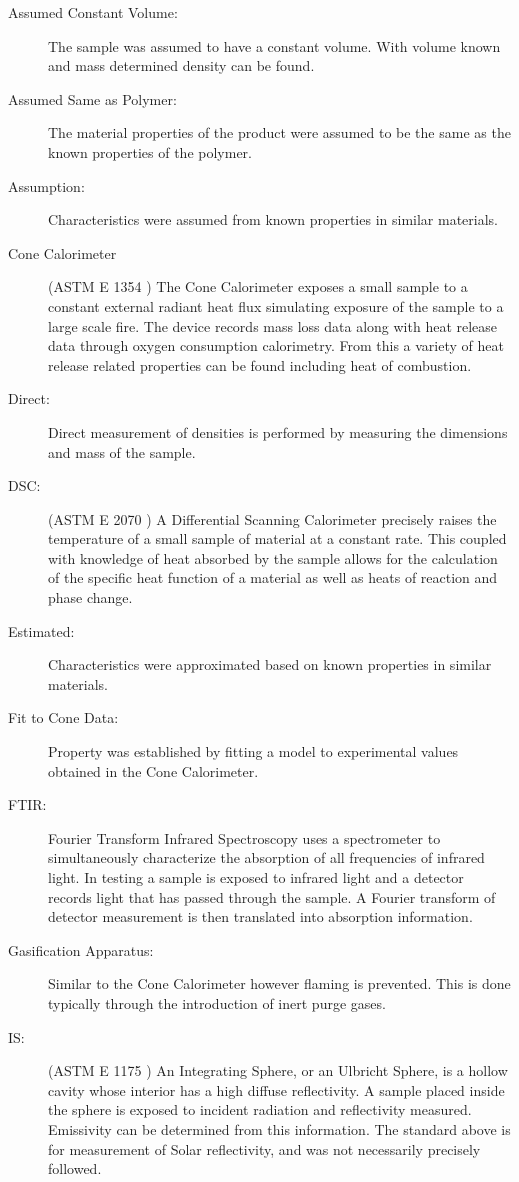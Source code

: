 \begin{description}
\item[Assumed Constant Volume:] The sample was assumed to have a constant volume. With volume known and mass determined density can be found.
\item[Assumed Same as Polymer:] The material properties of the product were assumed to be the same as the known properties of the polymer.
\item[Assumption:]  Characteristics were assumed from known properties in similar materials.
\item[Cone Calorimeter] (ASTM E 1354 \cite{conecal}) The Cone Calorimeter exposes a small sample to a constant external radiant heat flux simulating exposure of the sample to a large scale fire. The device records mass loss data along with heat release data through oxygen consumption calorimetry. From this a variety of heat release related properties can be found including heat of combustion.
\item[Direct:]  Direct measurement of densities is performed by measuring the dimensions and mass of the sample.
\item[DSC:] (ASTM E 2070 \cite{diffscancal}) A Differential Scanning Calorimeter precisely raises the temperature of a small sample of material at a constant rate. This coupled with knowledge of heat absorbed by the sample allows for the calculation of the specific heat function of a material as well as heats of reaction and phase change.
\item[Estimated:] Characteristics were approximated based on known properties in similar materials.
\item[Fit to Cone Data:] Property was established by fitting a model to experimental values obtained in the Cone Calorimeter.
\item[FTIR:] Fourier Transform Infrared Spectroscopy uses a spectrometer to simultaneously characterize the absorption of all frequencies of infrared light. In testing a sample is exposed to infrared light and a detector records light that has passed through the sample. A Fourier transform of detector measurement is then translated into absorption information.
\item[Gasification Apparatus:] Similar to the Cone Calorimeter however flaming is prevented. This is done typically through the introduction of inert purge gases.
\item[IS:] (ASTM E 1175 \cite{intgsphere}) An Integrating Sphere, or an Ulbricht Sphere, is a hollow cavity whose interior has a high diffuse reflectivity. A sample placed inside the sphere is exposed to incident radiation and reflectivity measured. Emissivity can be determined from this information. The standard above is for measurement of Solar reflectivity, and was not necessarily precisely followed.

\end{description}
